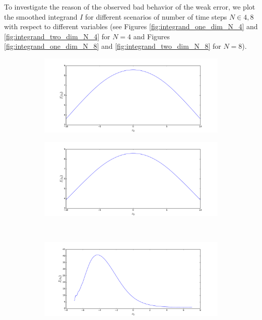 To investigate the reason of the observed bad behavior of the weak error, we plot the smoothed integrand $I$ for different scenarios of number of time steps $N \in {4,8}$ with respect to different variables (see Figures \ref{fig:integrand_one_dim_N_4} and \ref{fig:integrand_two_dim_N_4} for $N=4$ and  Figures \ref{fig:integrand_one_dim_N_8} and \ref{fig:integrand_two_dim_N_8} for $N=8$).
\FloatBarrier
\begin{figure}
	\begin{subfigure}{.4\textwidth}
		\centering
			\includegraphics[width=1\linewidth]{./figures/basket_call_2d_time_stepping/integrand_plotting/N_4/1d_plots/smoothed_integrand_basket_2D_N_4_z2}
		\caption{}
	\end{subfigure}%
	\begin{subfigure}{.4\textwidth}
		\centering
			\includegraphics[width=1\linewidth]{./figures/basket_call_2d_time_stepping/integrand_plotting/N_4/1d_plots/smoothed_integrand_basket_2D_N_4_z3}
		\caption{}
	\end{subfigure}\\[1ex]
	\begin{subfigure}{.4\textwidth}
		\centering
			\includegraphics[width=1\linewidth]{./figures/basket_call_2d_time_stepping/integrand_plotting/N_4/1d_plots/smoothed_integrand_basket_2D_N_4_z5}

\end{subfigure}
\end{figure}
